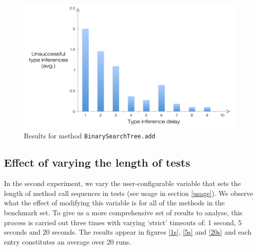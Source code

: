 \begin{figure}[h]
\hspace*{-0.5cm}
\centering
\includegraphics[scale=0.55]{./components/chapter7/bst.pdf}
\caption{Results for method \texttt{BinarySearchTree.add}}
\label{bstbench}
\end{figure}

\subsection{Effect of varying the length of tests}
\label{exp2}
In the second experiment, we vary the user-configurable variable that sets the length of method call sequences in tests (see usage in section \ref{usage}). We observe what the effect of modifying this variable is for all of the methods in the benchmark set. To give us a more comprehensive set of results to analyse, this process is carried out three times with varying `strict' timeouts of: 1 second, 5 seconds and 20 seconds. The results appear in figures \ref{1s}, \ref{5s} and \ref{20s} and each entry constitutes an average over 20 runs.

